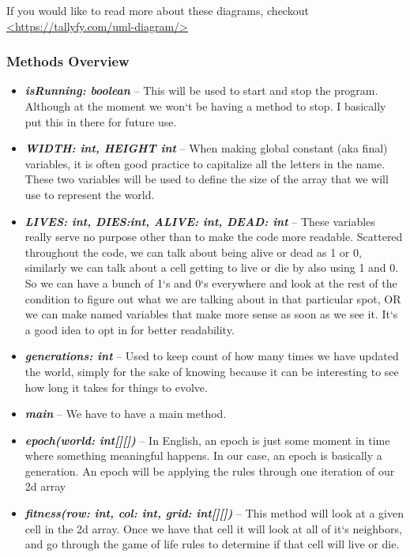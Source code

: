 \documentclass[11]{article}
\begin{document}
If you would like to read more about these diagrams, checkout \url{<https://tallyfy.com/uml-diagram/>}

\subsubsection{Methods Overview}
\begin{itemize}
  \item \textbf{\textit{isRunning: boolean}} --
	This will be used to start and stop the program. Although at the moment we won`t be having a method to stop. I basically put this in there for future use.

  \item \textbf{\textit{WIDTH: int, HEIGHT int}} --
	When making global constant (aka final) variables, it is often good practice to capitalize all the letters in the name. These two variables will be used to define the size of the array that we will use to represent the world.
	
	  \item \textbf{\textit{LIVES: int, DIES:int, ALIVE: int, DEAD: int}} --
	These variables really serve no purpose other than to make the code more readable. Scattered throughout the code, we can talk about being alive or dead as 1 or 0, similarly we can talk about a cell getting to live or die by also using 1 and 0. So we can have a bunch of 1`s and 0`s everywhere and look at the rest of the condition to figure out what we are talking about in that particular spot, OR we can make named variables that make more sense as soon as we see it. It`s a good idea to opt in for better readability. 
	
	\item \textbf{\textit{generations: int}} --
	Used to keep count of how many times we have updated the world, simply for the sake of knowing because it can be interesting to see how long it takes for things to evolve.
	 \item \textbf{\textit{main}} --
	We have to have a main method.
	
	  \item \textbf{\textit{epoch(world: int[][])}} --
		In English, an epoch is just some moment in time where something meaningful happens. In our case, an epoch is basically a generation. An epoch will be applying the rules through one iteration of our 2d array 
	
	  \item \textbf{\textit{fitness(row: int, col: int, grid: int[][])}} --
	This method will look at a given cell in the 2d array. Once we have that cell it will look at all of it`s neighbors, and go through the game of life rules to determine if that cell will live or die.
	

\end{itemize}
\end{document}
